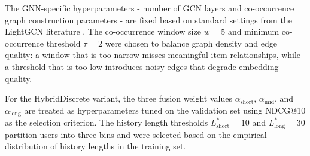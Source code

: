 \documentclass[12pt,a4paper]{report}
\begin{document}
The GNN-specific hyperparameters - number of GCN layers and co-occurrence
graph construction parameters - are fixed based on standard settings from
the LightGCN literature \citep{he2020lightgcn}. The co-occurrence window size
\(w = 5\) and minimum co-occurrence threshold \(\tau = 2\) were chosen to
balance graph density and edge quality: a window that is too narrow misses
meaningful item relationships, while a threshold that is too low introduces
noisy edges that degrade embedding quality.

For the HybridDiscrete variant, the three fusion weight values
\(\alpha_{\text{short}}\), \(\alpha_{\text{mid}}\), and \(\alpha_{\text{long}}\)
are treated as hyperparameters tuned on the validation set using
NDCG@10 as the selection criterion. The history length thresholds
\(L^*_{\text{short}} = 10\) and \(L^*_{\text{long}} = 30\) partition users
into three bins and were selected based on the empirical distribution of
history lengths in the training set.
\end{document}
